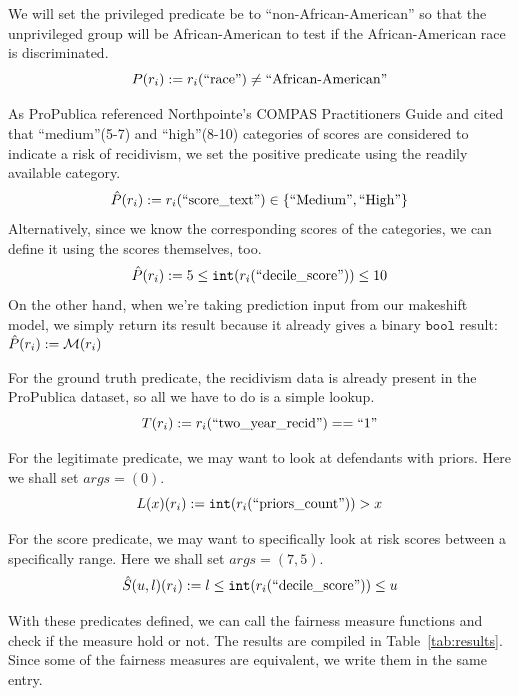 \documentclass[conference]{IEEEtran}
\begin{document}
We will set the privileged predicate be to ``non-African-American'' so that the unprivileged group will be African-American to test if the African-American race is discriminated.
\[
    P(r_i) := r_i(\text{``race''}) \neq \text{``African-American''}
\]

As ProPublica referenced Northpointe's COMPAS Practitioners Guide and cited that ``medium''(5-7) and ``high''(8-10) categories of scores are considered to indicate a risk of recidivism, we set the positive predicate using the readily available category.
\[
    \hat{P}(r_i) := r_i(\text{``score\_text''}) \in \{\text{``Medium''},\text{``High''}\}
\]
Alternatively, since we know the corresponding scores of the categories, we can define it using the scores themselves, too.
\[
    \hat{P}(r_i) := 5 \leq \mathtt{int}(r_i(\text{``decile\_score''})) \leq 10
\]
On the other hand, when we're taking prediction input from our makeshift model, we simply return its result because it already gives a binary $\mathtt{bool}$ result: $\hat{P}(r_i) := \mathcal{M}(r_i)$

For the ground truth predicate, the recidivism data is already present in the ProPublica dataset, so all we have to do is a simple lookup.
\[
    T(r_i) := r_i(\text{``two\_year\_recid''}) == \text{``1''}
\]

For the legitimate predicate, we may want to look at defendants with priors. Here we shall set $args = (0)$.
\[
    L(x)(r_i) := \mathtt{int}(r_i(\text{``priors\_count''})) > x
\]

For the score predicate, we may want to specifically look at risk scores between a specifically range. Here we shall set $args = (7,5)$.
\[
    \hat{S}(u,l)(r_i) := l \leq \mathtt{int}(r_i(\text{``decile\_score''})) \leq u
\]

With these predicates defined, we can call the fairness measure functions and check if the measure hold or not. The results are compiled in Table~\ref{tab:results}. Since some of the fairness measures are equivalent, we write them in the same entry.
\end{document}
